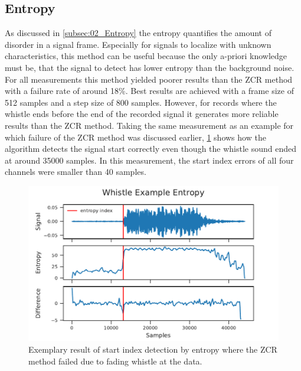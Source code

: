 \subsection{Entropy}
\label{subsec:04_entropy}

As discussed in \cref{subsec:02_Entropy} the entropy quantifies the amount
of disorder in a signal frame.
Especially for signals to localize with unknown characteristics,
this method can be useful because the only a-priori knowledge must be,
that the signal to detect has lower entropy than the background noise.
For all measurements this method yielded poorer results than the \ac{ZCR} method
with a failure rate of around 18\si{\percent}.
Best results are achieved with a frame size of 512 samples and a step size of 800
samples.
However, for records where the whistle ends before the end of the recorded signal
it generates more reliable results than the \ac{ZCR} method.
Taking the same measurement as an example for which failure of the \ac{ZCR} method
was discussed earlier, \cref{fig:04_entropyGood} shows how the algorithm
detects the signal start correctly even though the whistle sound ended at
around 35000 samples. In this measurement, the start index errors of all four
channels were smaller than 40 samples.
\begin{figure}[ht]
	\centering
	\includegraphics[]{figures/evaluation/entropy_good}
	\caption{Exemplary result of start index detection by entropy where
		the \ac{ZCR} method failed due to fading whistle
		at the data.}
	\label{fig:04_entropyGood}
\end{figure}

